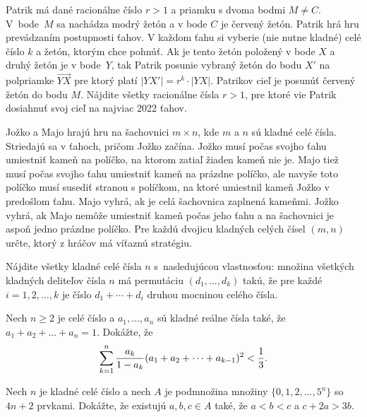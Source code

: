 {%

Patrik má dané racionálne číslo $r>1$ a priamku s dvoma bodmi $M\ne C$. V~bode~$M$ sa nachádza modrý žetón a v bode $C$ je červený žetón. Patrik hrá hru prevádzaním postupnosti ťahov. V každom ťahu si vyberie (nie nutne kladné) celé číslo $k$ a žetón, ktorým chce pohnúť. Ak je tento žetón položený v bode $X$ a druhý žetón je v bode~$Y$, tak Patrik posunie vybraný žetón do bodu $X'$ na polpriamke $\overrightarrow{YX}$ pre ktorý platí $|YX'|=r^k \cdot |YX|$.
Patrikov cieľ je posunúť červený žetón do bodu $M$. Nájdite všetky racionálne čísla $r>1$, pre ktoré vie Patrik dosiahnuť svoj cieľ na najviac 2022 ťahov.}

{%

Jožko a Majo hrajú hru na šachovnici $m\times n$, kde $m$ a $n$ sú kladné celé čísla. Striedajú sa v ťahoch, pričom Jožko začína. Jožko musí počas svojho ťahu umiestniť kameň na políčko, na ktorom zatiaľ žiaden kameň nie je. Majo tiež musí počas svojho ťahu umiestniť kameň na prázdne políčko, ale navyše toto  políčko musí susediť stranou s políčkom, na ktoré umiestnil kameň Jožko v predošlom ťahu.
\smallskip
Majo vyhrá, ak je celá šachovnica zaplnená kameňmi. Jožko vyhrá, ak Majo nemôže umiestniť kameň počas jeho ťahu a na šachovnici je aspoň jedno prázdne políčko.
Pre každú dvojicu kladných celých čísel $(m,n)$ určte, ktorý z hráčov má víťaznú stratégiu.}

{%

Nájdite všetky kladné celé čísla $n$ s~nasledujúcou vlastnosťou: množina všetkých kladných deliteľov čísla $n$ má permutáciu $(d_1,\dots,d_k)$ takú, že pre každé $i=1,2,\dots,k$ je číslo $d_1+\cdots+d_i$ druhou mocninou celého čísla.}

{%

Nech $n\ge 2$ je celé číslo a $a_1,\dots,a_n$ sú kladné reálne čísla také, že $a_1+a_2+\dots+a_n=1$. Dokážte, že
$$
\sum_{k=1}^n\frac{a_k}{1-a_k}(a_1+a_2+\dots+a_{k-1})^2<\frac 13.
\belowdisplayskip0pt
$$}

{%

Nech $n$ je kladné celé číslo a nech $A$ je podmnožina množiny $\{0,1,2,\dots,5^n\}$ so $4n+2$ prvkami. Dokážte, že existujú $a,b,c\in A$ také, že $a<b<c$ a $c+2a>3b$.}

